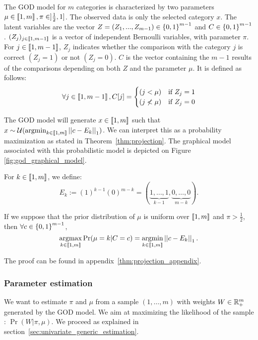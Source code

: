 The GOD model for $m$ categories is characterized by two parameters $\mu \in \left\llbracket1, m\right\rrbracket, \pi \in ]\frac{1}{2}, 1]$. The observed data is only the selected category $x$. The latent variables are the vector $Z = (Z_1,...,Z_{m-1}) \in \left\{ 0, 1 \right\}^{m - 1}$ and $C \in \left\{ 0, 1 \right\}^{m-1}$.
$(Z_j)_{j\in\left\llbracket1,m-1\right\rrbracket}$ is a vector of independent Bernoulli variables, with parameter $\pi$. For $j \in \left\llbracket1, m-1\right\rrbracket$, $Z_j$ indicates whether the comparison with the category $j$ is correct $(Z_j=1)$ or not $(Z_j=0)$. $C$ is the vector containing the $m-1$ results of the comparisons depending on both $Z$ and the parameter $\mu$. It is defined as follows:
\[
\forall j \in \left\llbracket1, m-1\right\rrbracket, C[j] = \begin{cases}
    (j < \mu) & \text{if}\  Z_j = 1\\
    (j \not< \mu ) & \text{if}\  Z_j = 0
\end{cases} \]

The GOD model will generate $x \in \left\llbracket1, m\right\rrbracket$ such that $x \sim \mathcal{U}(\operatorname*{argmin}_{k \in \left\llbracket1, m\right\rrbracket} \left|\left|c - E_k\right|\right|_1)$. We can interpret this as a probability maximization as stated in Theorem~\ref{thm:projection}. The graphical model associated with this probabilistic model is depicted on Figure \ref{fig:god_graphical_model}.


\begin{definition}
    For $k \in \left\llbracket1, m\right\rrbracket$, we define:
    \[E_k := (1)^{k-1} (0)^{m - k} = (\underset{k-1}{\underbrace{1, \dots, 1}}, \underset{m - k}{\underbrace{0, \dots, 0}} ). \]
\end{definition}


\begin{thm}
    \label{thm:projection}
    If we suppose that the prior distribution of $\mu$ is uniform over $\left\llbracket1, m\right\rrbracket$ and $\pi > \frac{1}{2}$, then \(\forall c \in \left\{ 0, 1 \right\}^{m-1}\),
    \[\operatorname*{argmax}_{k \in \left\llbracket1, m\right\rrbracket} \Pr(\mu = k | C = c) = \operatorname*{argmin}_{k \in \left\llbracket1, m\right\rrbracket} \left|\left|c - E_k\right|\right|_1.\]
\end{thm}

The proof can be found in appendix~\ref{thm:projection_appendix}.

\subsubsection{Parameter estimation}

We want to estimate $\pi$ and $\mu$ from a sample $(1, \dots, m)$ with weights $W \in \mathbb{R}_{+}^m$ generated by the GOD model. We aim at maximizing the likelihood of the sample : $\Pr(W | \pi, \mu)$. We proceed as explained in section~\ref{sec:univariate_generic_estimation}.

